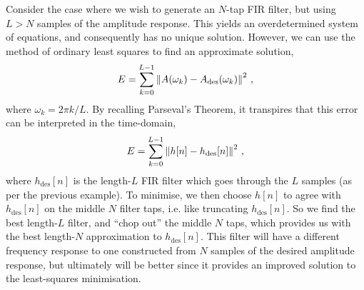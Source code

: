 %
Consider the case where we wish to generate an $N$-tap FIR filter, but
using $L>N$ samples of the amplitude response. This yields an overdetermined
system of equations, and consequently has no unique solution. However,
we can use the method of ordinary least squares to find an approximate
solution,
%
\begin{displaymath}
  E = \sum_{k=0}^{L-1}\left\lVert A(\omega_k) - A_\mathrm{des}(\omega_k)\right\rVert^2 \,,
\end{displaymath}
%
where $\omega_k = 2\pi k/L$. By recalling Parseval's Theorem, it transpires
that this error can be interpreted in the time-domain,
%
\begin{displaymath}
  E = \sum_{k=0}^{L-1} \left\lVert h[n] - h_\mathrm{des}[n]\right\rVert^2 \,,
\end{displaymath}
%
where $h_\mathrm{des}[n]$ is the length-$L$ FIR filter which goes through
the $L$ samples (as per the previous example). To minimise, we then choose
$h[n]$ to agree with $h_\mathrm{des}[n]$ on the middle $N$ filter taps, i.e.
like truncating $h_\mathrm{des}[n]$. So we find the best length-$L$ filter,
and ``chop out'' the middle $N$ taps, which provides us with the best
length-$N$ approximation to $h_\mathrm{des}[n]$. This filter will have
a different frequency response to one constructed from $N$ samples of
the desired amplitude response, but ultimately will be better since
it provides an improved solution to the least-squares minimisation.

